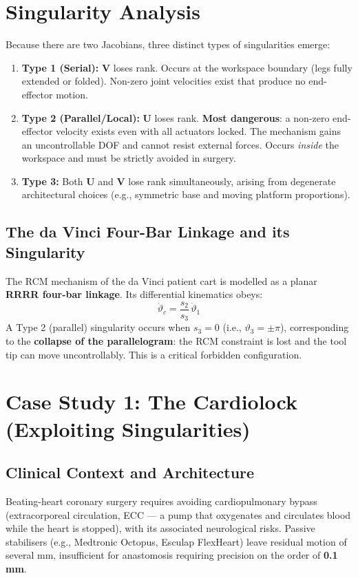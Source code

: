 \documentclass[11pt,a4paper,twoside]{report}
\begin{document}
\section{Singularity Analysis}
Because there are two Jacobians, three distinct types of singularities emerge:
\begin{enumerate}
    \item \textbf{Type 1 (Serial):} $\mathbf{V}$ loses rank. Occurs at the workspace boundary (legs fully extended or folded). Non-zero joint velocities exist that produce no end-effector motion.
    \item \textbf{Type 2 (Parallel/Local):} $\mathbf{U}$ loses rank. \textbf{Most dangerous}: a non-zero end-effector velocity exists even with all actuators locked. The mechanism gains an uncontrollable DOF and cannot resist external forces. Occurs \textit{inside} the workspace and must be strictly avoided in surgery.
    \item \textbf{Type 3:} Both $\mathbf{U}$ and $\mathbf{V}$ lose rank simultaneously, arising from degenerate architectural choices (e.g., symmetric base and moving platform proportions).
\end{enumerate}

\subsection{The da Vinci Four-Bar Linkage and its Singularity}
The RCM mechanism of the da Vinci patient cart is modelled as a planar \textbf{RRRR four-bar linkage}. Its differential kinematics obeys:
\begin{equation}
    \dot{\vartheta}_c = \frac{s_2}{s_3}\,\dot{\vartheta}_1
\end{equation}
A Type 2 (parallel) singularity occurs when $s_3 = 0$ (i.e., $\vartheta_3 = \pm\pi$), corresponding to the \textbf{collapse of the parallelogram}: the RCM constraint is lost and the tool tip can move uncontrollably. This is a critical forbidden configuration.

\section{Case Study 1: The Cardiolock (Exploiting Singularities)}
\subsection{Clinical Context and Architecture}
Beating-heart coronary surgery requires avoiding cardiopulmonary bypass (extracorporeal circulation, ECC — a pump that oxygenates and circulates blood while the heart is stopped), with its associated neurological risks. Passive stabilisers (e.g., Medtronic Octopus, Esculap FlexHeart) leave residual motion of several mm, insufficient for anastomosis requiring precision on the order of \textbf{0.1\,mm}.
\end{document}
